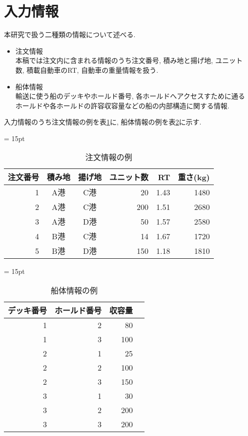 \section{入力情報}
本研究で扱う二種類の情報について述べる.
\begin{itemize}

\item 注文情報 \\
本稿では注文内に含まれる情報のうち注文番号, 積み地と揚げ地, ユニット数, 積載自動車のRT, 自動車の重量情報を扱う.

\item 船体情報 \\
輸送に使う船のデッキやホールド番号, 各ホールドへアクセスすために通るホールドや各ホールドの許容収容量などの船の内部構造に関する情報.

\end{itemize}

入力情報のうち注文情報の例を表\ref{table21}に, 船体情報の例を表\ref{table22}に示す. \\

\begin{table}[htbp]
\tabcolsep = 15pt
\renewcommand{\arraystretch}{0.8}
\caption{注文情報の例}
\label{table21}
\begin{center}
\begin{tabular}{rccrrr} \hline
注文番号 & 積み地 & 揚げ地 & ユニット数 & RT & 重さ(kg) \\ \hline
1 & A港 & C港 & 20 & 1.43 & 1480 \\
2 & A港 & C港 & 200 & 1.51 & 2680 \\
3 & A港 & D港 & 50 & 1.57 & 2580 \\
4 & B港 & C港 & 14 & 1.67 & 1720 \\
5 & B港 & D港 & 150 & 1.18 & 1810 \\
\hline
\end{tabular}
\end{center}
\end{table}

\begin{table}[htbp]
\centering
\tabcolsep = 15pt
\renewcommand{\arraystretch}{0.8}
\caption{船体情報の例}
\label{table22}
\begin{center}
\begin{tabular}{rrrr} \hline
デッキ番号 & ホールド番号 & 収容量 \\ \hline
1 & 2 & 80  \\
1 & 3 & 100  \\
2 & 1 & 25  \\
2 & 2 & 100 \\
2 & 3 & 150  \\
3 & 1 & 30 \\
3 & 2 & 200 \\
3 & 3 & 200 \\
\hline
\end{tabular}
\end{center}
\end{table}

